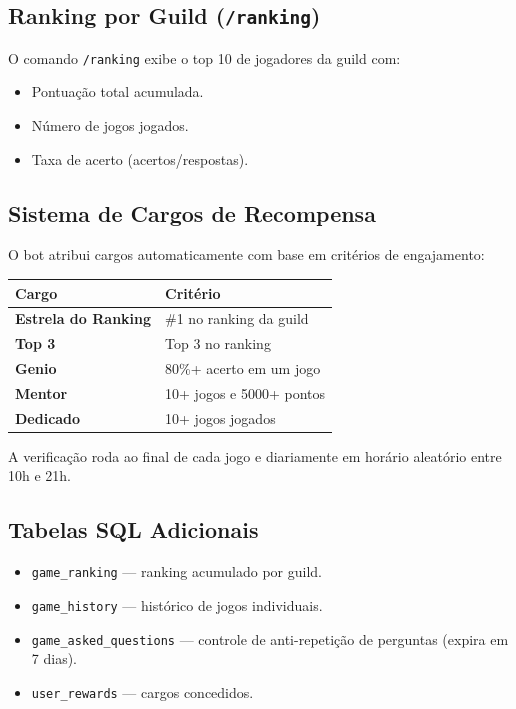 \documentclass[11pt,a4paper]{article}
\begin{document}
\subsection{Ranking por Guild (\texttt{/ranking})}

O comando \texttt{/ranking} exibe o top 10 de jogadores da guild com:
\begin{itemize}[leftmargin=1.5em, itemsep=0.3em]
  \item Pontuação total acumulada.
  \item Número de jogos jogados.
  \item Taxa de acerto (acertos/respostas).
\end{itemize}

\subsection{Sistema de Cargos de Recompensa}

O bot atribui cargos automaticamente com base em critérios de engajamento:

\begin{center}
\small
\begin{tabularx}{0.7\textwidth}{>{\bfseries}l X}
\toprule
\rowcolor{tableheader}
\color{tableheadertext}\textbf{Cargo} & \color{tableheadertext}\textbf{Crit\'erio} \\
\midrule
\rowcolor{tableroweven}
Estrela do Ranking & \#1 no ranking da guild \\
Top 3 & Top 3 no ranking \\
\rowcolor{tableroweven}
Genio & 80\%+ acerto em um jogo \\
Mentor & 10+ jogos e 5000+ pontos \\
\rowcolor{tableroweven}
Dedicado & 10+ jogos jogados \\
\bottomrule
\end{tabularx}
\end{center}

A verificação roda ao final de cada jogo e diariamente em horário aleatório entre 10h e 21h.

\subsection{Tabelas SQL Adicionais}

\begin{itemize}[leftmargin=1.5em, itemsep=0.3em]
  \item \texttt{game\_ranking} — ranking acumulado por guild.
  \item \texttt{game\_history} — histórico de jogos individuais.
  \item \texttt{game\_asked\_questions} — controle de anti-repetição de perguntas (expira em 7 dias).
  \item \texttt{user\_rewards} — cargos concedidos.
\end{itemize}
\end{document}
